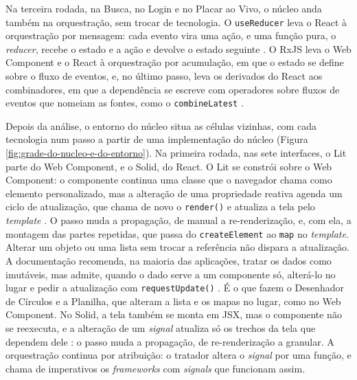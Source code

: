 Na terceira rodada, na Busca, no Login e no Placar ao Vivo, o núcleo
anda também na orquestração, sem trocar de tecnologia.
O \texttt{useReducer} leva o React à orquestração por mensagem: cada evento
vira uma ação, e uma função pura, o \emph{reducer}, recebe o estado e a ação
e devolve o estado seguinte \cite{meta2026d}.
O RxJS leva o Web Component e o React à orquestração por acumulação, em
que o estado se define sobre o fluxo de eventos, e, no último passo,
leva os derivados do React aos combinadores, em que a dependência se
escreve com operadores sobre fluxos de eventos que nomeiam as fontes,
como o \texttt{combineLatest} \cite{reactivex2026}.

Depois da análise, o entorno do núcleo situa as células vizinhas, com
cada tecnologia num passo a partir de uma implementação do núcleo
(Figura \ref{fig:grade-do-nucleo-e-do-entorno}).
Na primeira rodada, nas sete interfaces, o Lit parte do Web Component,
e o Solid, do React.
O Lit se constrói sobre o Web Component: o componente continua uma
classe que o navegador chama como elemento personalizado, mas a
alteração de uma propriedade reativa agenda um ciclo de atualização,
que chama de novo o \texttt{render()} e atualiza a tela pelo \emph{template}
\cites{google2026d}{google2026e}.
O passo muda a propagação, de manual a re-renderização, e, com ela, a
montagem das partes repetidas, que passa do \texttt{createElement} ao \texttt{map} no
\emph{template}.
Alterar um objeto ou uma lista sem trocar a referência não dispara a
atualização.
A documentação recomenda, na maioria das aplicações, tratar os dados
como imutáveis, mas admite, quando o dado serve a um componente só,
alterá-lo no lugar e pedir a atualização com \texttt{requestUpdate()}
\cite{google2026e}.
É o que fazem o Desenhador de Círculos e a Planilha, que alteram a
lista e os mapas no lugar, como no Web Component.
No Solid, a tela também se monta em JSX, mas o componente não se
reexecuta, e a alteração de um \emph{signal} atualiza só os trechos da tela
que dependem dele \cites[][ p. 289:38]{lee2025}{solidjs2026}: o passo
muda a propagação, de re-renderização a granular.
A orquestração continua por atribuição: o tratador altera o \emph{signal} por
uma função, e \textcite[p. 25]{bahr2025} chama de imperativos os
\emph{frameworks} com \emph{signals} que funcionam assim.

